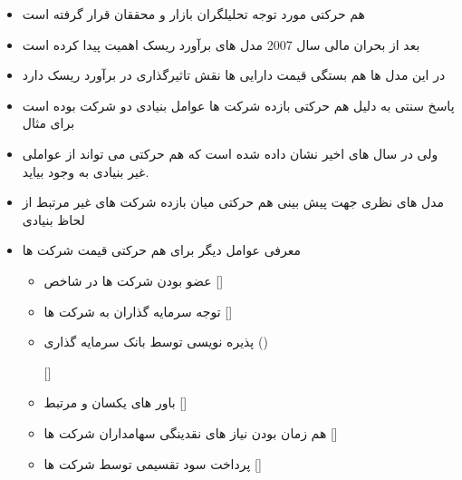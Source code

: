 \documentclass[12pt, a4paper]{article}
\begin{document}
\begin{itemize}
\item
هم حرکتی مورد توجه تحلیلگران بازار و محققان قرار گرفته است
\item
بعد از بحران مالی سال 2007 مدل های برآورد ریسک اهمیت پیدا کرده است
\item
در این مدل ها هم بستگی قیمت دارایی ها نقش تاثیرگذاری در برآورد ریسک دارد
\item
پاسخ سنتی به دلیل هم حرکتی بازده شرکت ها عوامل بنیادی دو شرکت بوده است  برای مثال 
 \item 
 ولی در سال های اخیر نشان داده شده است که هم حرکتی می تواند از عواملی غیر بنیادی به وجود بیاید. 
 \item
 مدل های نظری جهت پیش بینی هم حرکتی میان بازده شرکت های غیر مرتبط از لحاظ بنیادی
 \item
 معرفی عوامل دیگر برای هم حرکتی قیمت شرکت ها
 \begin{itemize}
 \item 
 عضو بودن شرکت ها در شاخص
   []
      \item
      توجه سرمایه گذاران به شرکت ها
      []  
        \item 
      پذیره نویسی توسط بانک سرمایه گذاری 
      ()
      
      []  
      \item
      باور های یکسان و مرتبط
      [] 
         \item
         هم زمان بودن نیاز های نقدینگی سهامداران شرکت ها
         []  
            \item
         پرداخت سود تقسیمی توسط شرکت ها
         []  
 \end{itemize}



\end{itemize}
\end{document}
